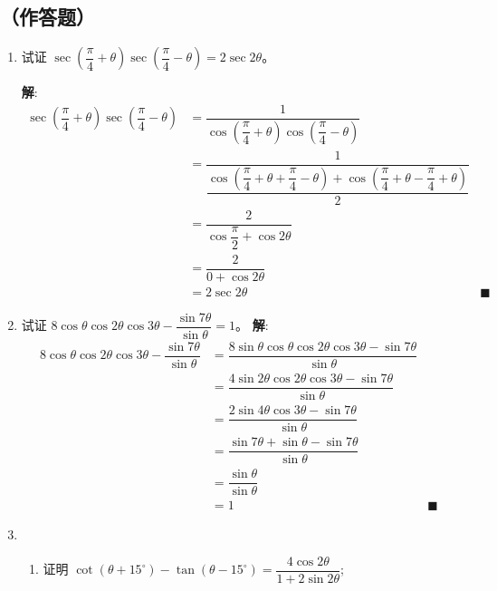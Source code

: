\documentclass{report}
\newcommand{\sol}{\vspace{0.2cm}\textbf{解}:}
\begin{document}
\subsection*{（作答题）}
\begin{enumerate}[leftmargin=*]
    \item 试证 $\sec \left(\dfrac{\pi}{4}+\theta\right) \sec \left(\dfrac{\pi}{4}-\theta\right)=2 \sec 2 \theta$。
    
    \sol{}
    \begin{align*}
        \sec \left(\dfrac{\pi}{4}+\theta\right) \sec \left(\dfrac{\pi}{4}-\theta\right) &= \dfrac{1}{\cos \left(\dfrac{\pi}{4}+\theta\right)\cos \left(\dfrac{\pi}{4}-\theta\right)} \\
        &= \dfrac{1}{\dfrac{\cos\left(\dfrac{\pi}{4}+\theta + \dfrac{\pi}{4}-\theta\right)+\cos\left(\dfrac{\pi}{4}+\theta - \dfrac{\pi}{4}+\theta\right)}{2}} \\
        &= \dfrac{2}{\cos \dfrac{\pi}{2}+\cos 2 \theta} \\
        &= \dfrac{2}{0+\cos 2 \theta} \\
        &= 2 \sec 2 \theta &\blacksquare
    \end{align*}

    \item 试证 $8 \cos \theta \cos 2 \theta \cos 3 \theta-\dfrac{\sin 7 \theta}{\sin \theta}=1$。
    \sol{}
    \begin{align*}
        8 \cos \theta \cos 2 \theta \cos 3 \theta-\dfrac{\sin 7 \theta}{\sin \theta} &= \dfrac{8\sin\theta\cos\theta\cos2\theta\cos3\theta-\sin7\theta}{\sin\theta} \\
        &= \dfrac{4\sin2\theta\cos2\theta\cos3\theta-\sin7\theta}{\sin\theta} \\
        &= \dfrac{2\sin4\theta\cos3\theta-\sin7\theta}{\sin\theta} \\
        &= \dfrac{\sin7\theta + \sin\theta - \sin7\theta}{\sin\theta} \\
        &= \dfrac{\sin\theta}{\sin\theta} \\
        &= 1 &\blacksquare
        \end{align*}
        \newpage
    \item \begin{enumerate}
        \item 证明 $\cot \left(\theta+15^{\circ}\right)-\tan \left(\theta-15^{\circ}\right)=\dfrac{4 \cos 2 \theta}{1+2 \sin 2 \theta}$;
        

\end{enumerate}
\end{enumerate}
\end{document}
